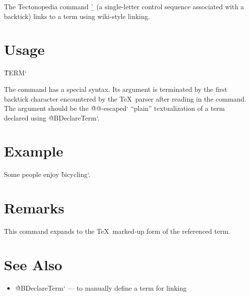 
The Tectonopedia command \b{\string\`} (a single-letter control sequence
associated with a backtick) links to a term using wiki-style linking.

\section*{Usage}

\begin{texdisp}
\`TERM`
\end{texdisp}

The command has a special syntax. Its argument is terminated by the first
backtick character encountered by the \TeX\ parser after reading in the command.
The argument should be the \`@@-escaped` “plain” textualization of a term
declared using \`@BDeclareTerm`.

\section*{Example}

\begin{texdisp}

Some people enjoy \`bicycling`.
\end{texdisp}

\section*{Remarks}

This command expands to the \TeX\ marked-up form of the referenced term.

\section*{See Also}

\begin{itemize}
\item \`@BDeclareTerm` — to manually define a term for linking
\end{itemize}